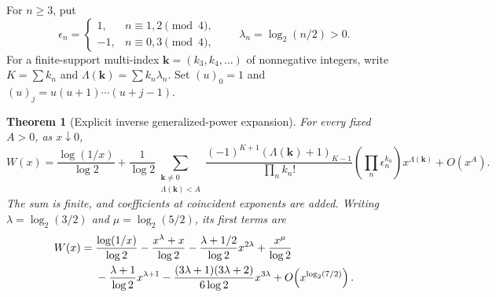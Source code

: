 \documentclass[11pt,a4paper]{article}
\numberwithin{equation}{section}
\newtheorem{theorem}{Theorem}[section]
\theoremstyle{definition}
\theoremstyle{remark}
\begin{document}
For $n\ge3$, put
\begin{equation}\label{eq:lambdas}
 \epsilon_n=
 \begin{cases}1,&n\equiv1,2\pmod4,\\-1,&n\equiv0,3\pmod4,
 \end{cases}
 \qquad \lambda_n=\log_2(n/2)>0.
\end{equation}
For a finite-support multi-index $\mathbf k=(k_3,k_4,\ldots)$ of
nonnegative integers, write $K=\sum k_n$ and
$\Lambda(\mathbf k)=\sum k_n\lambda_n$. Set $(u)_0=1$ and
$(u)_j=u(u+1)\cdots(u+j-1)$.

\begin{theorem}[Explicit inverse generalized-power expansion]
\label{thm:inverse}
For every fixed $A>0$, as $x\downarrow0$,
\begin{equation}\label{eq:inverseall}
 W(x)=\frac{\log(1/x)}{\log2}
 +\frac1{\log2}
 \sum_{\substack{\mathbf k\ne0\\\Lambda(\mathbf k)<A}}
 \frac{(-1)^{K+1}(\Lambda(\mathbf k)+1)_{K-1}}
      {\prod_n k_n!}
 \left(\prod_n\epsilon_n^{k_n}\right)x^{\Lambda(\mathbf k)}
 +O(x^A).
\end{equation}
The sum is finite, and coefficients at coincident exponents are added.
Writing $\lambda=\log_2(3/2)$ and $\mu=\log_2(5/2)$, its first terms are
\begin{align}\label{eq:inversefirst}
 W(x)={}&\frac{\log(1/x)}{\log2}
 -\frac{x^\lambda+x}{\log2}
 -\frac{\lambda+1/2}{\log2}x^{2\lambda}
 +\frac{x^\mu}{\log2}\notag\\
 &-\frac{\lambda+1}{\log2}x^{\lambda+1}
 -\frac{(3\lambda+1)(3\lambda+2)}{6\log2}x^{3\lambda}
 +O\!\left(x^{\log_2(7/2)}\right).
\end{align}
\end{theorem}
\end{document}
